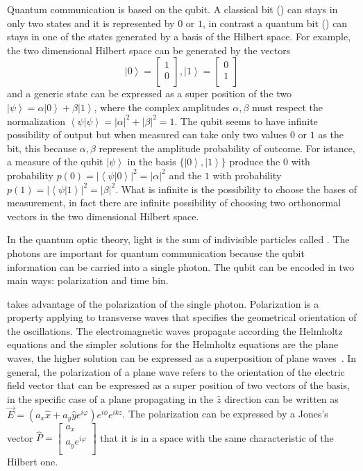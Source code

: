 Quantum communication is based on the qubit. A classical bit () can stays in only two states and it is represented by $0$ or $1$, in contrast a quantum bit () can stays in one of the states generated by  a basis of the Hilbert space.
For example, the two dimensional Hilbert space can be generated by the vectors
\begin{equation}
  \left|0\right> = \begin{bmatrix} 1 \\ 0 \\ \end{bmatrix}, \left|1\right> = \begin{bmatrix} 0 \\ 1 \\ \end{bmatrix}
\end{equation}
and a generic state can be expressed as a super position of the two $\left|\psi\right> = \alpha\left|0\right> + \beta\left|1\right>$, where the complex amplitudes $\alpha, \beta$ must respect the normalization $\left<\psi|\psi\right> = |\alpha|^2 + |\beta|^2 = 1$.
The qubit seems to have infinite possibility of output but when measured can take only two values $0$ or $1$ as the bit, this because $\alpha, \beta$ represent the amplitude probability of outcome. For istance, a measure of the qubit $\left|\psi\right>$ in the basis $\{\left|0\right>, \left|1\right>\}$ produce the $0$ with probability $p(0) = |\left<\psi|0\right>|^2 = |\alpha|^2$ and the $1$ with probability $p(1) = |\left<\psi|1\right>|^2 = |\beta|^2$. What is infinite is the possibility to choose the bases of measurement, in fact there are infinite possibility of choosing two orthonormal vectors in the two dimensional Hilbert space.

In the quantum optic theory, light is the sum of indivisible particles called . The photons are important for quantum communication because the qubit information can be carried into a single photon. The qubit can be encoded in two main ways: polarization and time bin.

 takes advantage of the polarization of the single photon. Polarization is a property applying to transverse waves that specifies the geometrical orientation of the oscillations. The electromagnetic waves propagate according the Helmholtz equations and the simpler solutions for the Helmholtz equations are the plane waves, the higher solution can be expressed as a superposition of plane waves~\cite{a21}. In general, the polarization of a plane wave refers to the orientation of the electric field vector that can be expressed as a super position of two vectors of the basis, in the specific case of a plane propagating in the $\hat{z}$ direction can be written as $\vec{E} = (a_x \hat{x} + a_y \hat{y} e^{i \varphi}) e^{i \phi} e^{i k z}$. The polarization can be expressed by a Jones's vector $\hat{P} = \begin{bmatrix} a_x \\ a_y e^{i\varphi} \\ \end{bmatrix}$ that it is in a space with the same characteristic of the Hilbert one.

